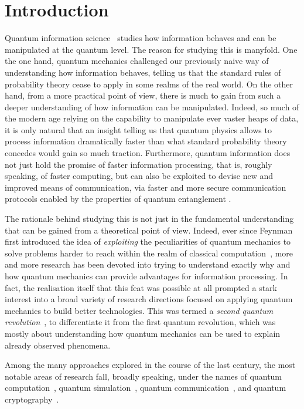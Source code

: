 \chapter{Introduction}
Quantum information science~\cite{nielsen2006quantum,watrous2018theory} studies how information behaves and can be manipulated at the quantum level.
The reason for studying this is manyfold. One the one hand, quantum mechanics challenged our previously naive way of understanding how information behaves, telling us that the standard rules of probability theory cease to apply in some realms of the real world.
On the other hand, from a more practical point of view, there is much to gain from such a deeper understanding of how information can be manipulated. Indeed, so much of the modern age relying on the capability to manipulate ever vaster heaps of data, it is only natural that an insight telling us that quantum physics allows to process information dramatically faster than what standard probability theory concedes would gain so much traction.
Furthermore, quantum information does not just hold the promise of faster information processing, that is, roughly speaking, of faster computing, but can also be exploited to devise new and improved means of communication, via faster and more secure communication protocols enabled by the properties of quantum entanglement .

The rationale behind studying this is not just in the fundamental understanding that can be gained from a theoretical point of view. Indeed, ever since Feynman first introduced the idea of \emph{exploiting} the peculiarities of quantum mechanics to solve problems harder to reach within the realm of classical computation~\cite{feynman1982simulating}, more and more research has been devoted into trying to understand exactly why and how quantum mechanics can provide advantages for information processing.
In fact, the realisation itself that this feat was possible at all prompted a stark interest into a broad variety of research directions focused on applying quantum mechanics to build better technologies. This was termed a \textit{second quantum revolution}~\cite{dowling2003quantum}, to differentiate it from the first quantum revolution, which was mostly about understanding how quantum mechanics can be used to explain already observed phenomena.

Among the many approaches explored in the course of the last century, the most notable areas of research fall, broadly speaking, under the names of quantum computation~\cite{shor1997polynomial,steane1998quantum,ladd2010quantum}, quantum simulation~\cite{lloyd1996universal,georgescu2014quantum,koch2019quantum}, quantum communication~\cite{bennett1993teleporting}, and quantum cryptography~\cite{bennett2014quantum}.

